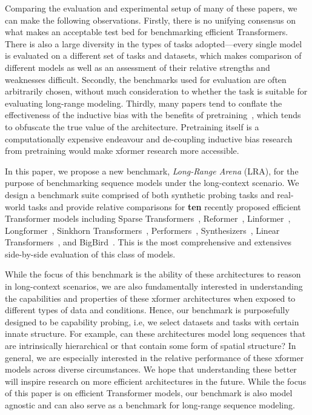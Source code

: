 \documentclass{article} \usepackage{iclr2021_conference,times}
\newcommand{\lra}{Long-Range Arena\xspace}
\begin{document}
Comparing the evaluation and experimental setup of many of these papers, we can make the following observations. Firstly, there is no unifying consensus on what makes an acceptable test bed for benchmarking efficient Transformers. There is also a large diversity in the types of tasks adopted---every single model is evaluated on a different set of tasks and datasets, which makes comparison of different models as well as an assessment of their relative strengths and weaknesses difficult. Secondly, the benchmarks used for evaluation are often arbitrarily chosen, without much consideration to whether the task is suitable for evaluating long-range modeling. Thirdly, many papers tend to conflate the effectiveness of the inductive bias with the benefits of pretraining~\citep{ainslie2020etc,zaheer2020big,wang2020linformer}, which tends to obfuscate the true value of the architecture. Pretraining itself is a computationally expensive endeavour and de-coupling inductive bias research from pretraining would make xformer research more accessible. 



In this paper, we propose a new benchmark, \textit{\lra} (LRA), for the purpose of benchmarking sequence models under the long-context scenario. We design a benchmark suite comprised of both synthetic probing tasks and real-world tasks and provide relative comparisons for \textbf{ten} recently proposed efficient Transformer models including Sparse Transformers~\citep{child2019generating}, Reformer~\citep{kitaev2020reformer}, Linformer~\citep{wang2020linformer}, Longformer~\citep{beltagy2020longformer}, Sinkhorn Transformers~\citep{tay2020sparse}, Performers~\citep{choromanski2020rethinking}, Synthesizers~\citep{tay2020synthesizer}, Linear Transformers~\citep{katharopoulos2020transformers}, and BigBird~\citep{zaheer2020big}. This is the most comprehensive and extensives side-by-side evaluation of this class of models. 

While the focus of this benchmark is the ability of these architectures to reason in long-context scenarios, we are also fundamentally interested in understanding the capabilities and properties of these xformer architectures when exposed to different types of data and conditions. Hence, our benchmark is purposefully designed to be capability probing, i.e, we select datasets and tasks with certain innate structure. For example, can these architectures model long sequences that are intrinsically hierarchical or that contain some form of spatial structure? In general, we are especially interested in the relative performance of these xformer models across diverse circumstances. We hope that understanding these better will inspire research on more efficient architectures in the future. While the focus of this paper is on efficient Transformer models, our benchmark is also model agnostic and can also serve as a benchmark for long-range sequence modeling.
\end{document}
